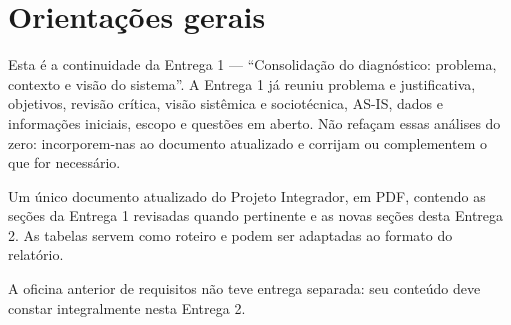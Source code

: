 \section*{Orientações gerais}
Esta é a continuidade da Entrega 1 — ``Consolidação do diagnóstico: problema, contexto e visão do sistema''. A Entrega 1 já reuniu problema e justificativa, objetivos, revisão crítica, visão sistêmica e sociotécnica, AS-IS, dados e informações iniciais, escopo e questões em aberto. Não refaçam essas análises do zero: incorporem-nas ao documento atualizado e corrijam ou complementem o que for necessário.

\begin{keyidea}[Entrega]
Um único documento atualizado do Projeto Integrador, em PDF, contendo as seções da Entrega 1 revisadas quando pertinente e as novas seções desta Entrega 2. As tabelas servem como roteiro e podem ser adaptadas ao formato do relatório.

A oficina anterior de requisitos não teve entrega separada: seu conteúdo deve constar integralmente nesta Entrega 2.
\end{keyidea}
